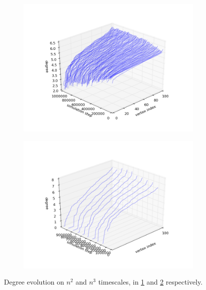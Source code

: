 \documentclass[11pt]{article}
\begin{document}
\begin{figure}[h!]
  \centering
  \begin{subfigure}{.5\textwidth}
    \centering
    \includegraphics[width=1.0\linewidth]{nSquaredTimescale}
    \caption{}
    \label{fig:paN2}
  \end{subfigure}%
  \begin{subfigure}{.5\textwidth}
    \centering
    \includegraphics[width=1.0\linewidth]{nCubedTimescale}
    \caption{}
    \label{fig:paN3}
  \end{subfigure}%
  \caption{Degree evolution on $n^{2}$ and $n^{3}$ timescales, in \ref{fig:paN2} and \ref{fig:paN3} respectively.}
  \label{fig:vmResults}
\end{figure}
\end{document}
